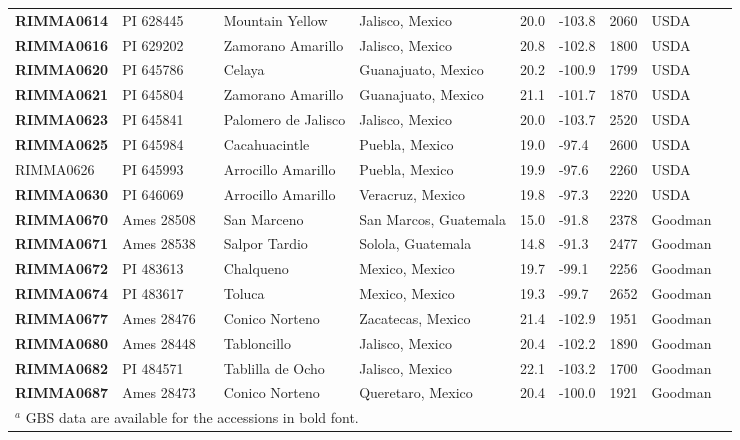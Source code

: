 \begin{table}[h]
\begin{center}
{\begin{tabular}{llllllllll}
{\bf RIMMA0614}	&	PI 628445	&		&	Mountain Yellow	&	Jalisco, Mexico	&	20.0 	&	-103.8 	&	2060	&	USDA	\\
{\bf RIMMA0616}	&	PI 629202	&		&	Zamorano Amarillo	&	Jalisco, Mexico	&	20.8 	&	-102.8 	&	1800	&	USDA	\\
{\bf RIMMA0620}	&	PI 645786	&		&	Celaya	&	Guanajuato, Mexico	&	20.2 	&	-100.9 	&	1799	&	USDA	\\
{\bf RIMMA0621}	&	PI 645804	&		&	Zamorano Amarillo	&	Guanajuato, Mexico	&	21.1 	&	-101.7 	&	1870	&	USDA	\\
{\bf RIMMA0623}	&	PI 645841	&		&	Palomero de Jalisco	&	Jalisco, Mexico	&	20.0 	&	-103.7 	&	2520	&	USDA	\\
{\bf RIMMA0625}	&	PI 645984	&		&	Cacahuacintle	&	Puebla, Mexico	&	19.0 	&	-97.4 	&	2600	&	USDA	\\
RIMMA0626	&	PI 645993	&		&	Arrocillo Amarillo	&	Puebla, Mexico	&	19.9 	&	-97.6 	&	2260	&	USDA	\\
{\bf RIMMA0630}	&	PI 646069	&		&	Arrocillo Amarillo	&	Veracruz, Mexico	&	19.8 	&	-97.3 	&	2220	&	USDA	\\
{\bf RIMMA0670}	&	Ames 28508	&		&	San Marceno	&	San Marcos, Guatemala	&	15.0 	&	-91.8 	&	2378	&	Goodman	\\
{\bf RIMMA0671}	&	Ames 28538	&		&	Salpor Tardio	&	Solola, Guatemala	&	14.8 	&	-91.3 	&	2477	&	Goodman	\\
{\bf RIMMA0672}	&	PI 483613	&		&	Chalqueno	&	Mexico, Mexico	&	19.7 	&	-99.1 	&	2256	&	Goodman	\\
{\bf RIMMA0674}	&	PI 483617	&		&	Toluca	&	Mexico, Mexico	&	19.3 	&	-99.7 	&	2652	&	Goodman	\\
{\bf RIMMA0677}	&	Ames 28476 	&		&	Conico Norteno	&	Zacatecas, Mexico	&	21.4 	&	-102.9 	&	1951	&	Goodman	\\
{\bf RIMMA0680}	&	Ames 28448	&		&	Tabloncillo	&	Jalisco, Mexico	&	20.4 	&	-102.2 	&	1890	&	Goodman	\\
{\bf RIMMA0682}	&	PI 484571	&		&	Tablilla de Ocho	&	Jalisco, Mexico	&	22.1 	&	-103.2 	&	1700	&	Goodman	\\
{\bf RIMMA0687}	&	Ames 28473	&		&	Conico Norteno	&	Queretaro, Mexico	&	20.4 	&	-100.0 	&	1921	&	Goodman	\\[-0.1mm]	
	\hline\hline
\multicolumn{9}{l}{$^a$ GBS data are available for the accessions in bold font.}\\
    \end{tabular}}

\end{center} 

\end{table}

